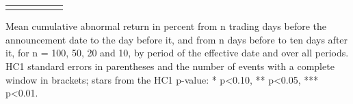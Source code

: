\begin{threeparttable}
\begin{tabular}{@{}lccccc}
\addlinespace[0.25ex]
\bottomrule
\end{tabular}
\endgroup
\noindent\begin{minipage}{\linewidth}\smallskip\footnotesize
Mean cumulative abnormal return in percent from n trading days before the announcement date to the day before it, and from n days before to ten days after it, for n = 100, 50, 20 and 10, by period of the effective date and over all periods. HC1 standard errors in parentheses and the number of events with a complete window in brackets; stars from the HC1 p-value: * p<0.10, ** p<0.05, *** p<0.01.\end{minipage}

\end{threeparttable}